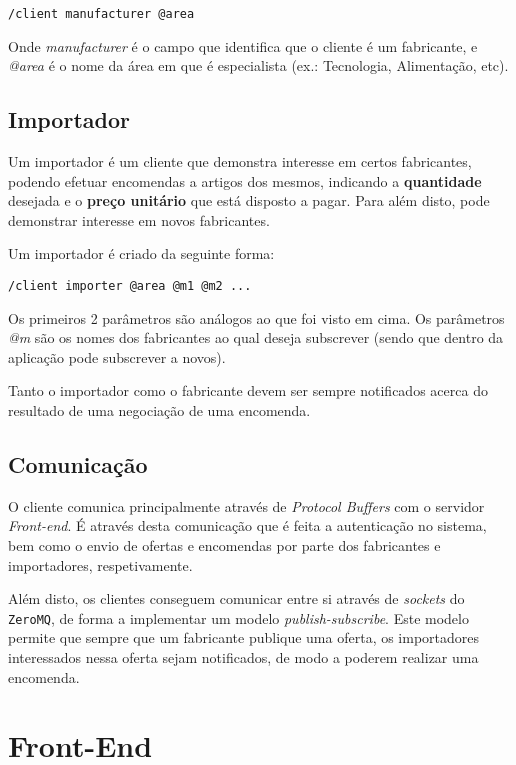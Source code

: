 \documentclass[12pt, a4paper]{report}
\begin{document}
\texttt{/client manufacturer @area}

Onde \textit{manufacturer} é o campo que identifica que o cliente é um fabricante, e \textit{@area} é o nome da área em que é especialista (ex.: Tecnologia, Alimentação, etc).

\section{Importador}
Um importador é um cliente que demonstra interesse em certos fabricantes, podendo efetuar encomendas a artigos dos mesmos, indicando a \textbf{quantidade} desejada e o \textbf{preço unitário} que está disposto a pagar. Para além disto, pode demonstrar interesse em novos fabricantes.

Um importador é criado da seguinte forma:

\texttt{/client importer @area @m1 @m2 ...}

Os primeiros 2 parâmetros são análogos ao que foi visto em cima. Os parâmetros \textit{@m} são os nomes dos fabricantes ao qual deseja subscrever (sendo que dentro da aplicação pode subscrever a novos).

Tanto o importador como o fabricante devem ser sempre notificados acerca do resultado de uma negociação de uma encomenda.

\section{Comunicação}

O cliente comunica principalmente através de \textit{Protocol Buffers} com o servidor \textit{Front-end}. É através desta comunicação que é feita a autenticação no sistema, bem como o envio de ofertas e encomendas por parte dos fabricantes e importadores, respetivamente.

Além disto, os clientes conseguem comunicar entre si através de \textit{sockets} do \texttt{ZeroMQ}, de forma a implementar um modelo \textit{publish-subscribe}.
Este modelo permite que sempre que um fabricante publique uma oferta, os importadores interessados nessa oferta sejam notificados, de modo a poderem realizar uma encomenda.
\chapter{Front-End}
\end{document}
